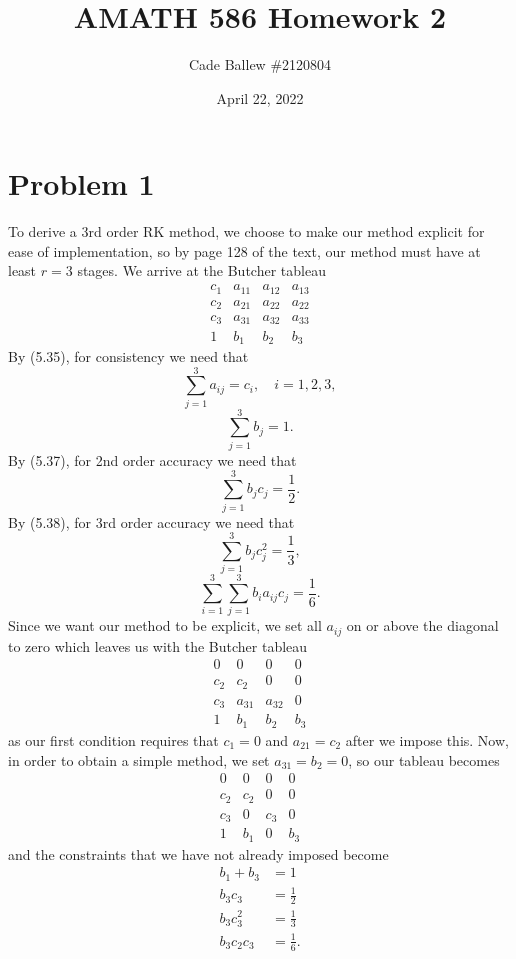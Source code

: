 \documentclass{article}
\title{AMATH 586 Homework 2}
\author{Cade Ballew \#2120804}
\date{April 22, 2022}
\begin{document}
	
\maketitle
	
\section{Problem 1}
To derive a 3rd order RK method, we choose to make our method explicit for ease of implementation, so by page 128 of the text, our method must have at least $r=3$ stages. We arrive at the Butcher tableau 
\[
\renewcommand\arraystretch{1.2}
\begin{array}
	{c|ccc}
	c_1 & a_{11}&a_{12}&a_{13}\\
	c_2 &a_{21} &a_{22} &a_{22}\\
	c_3 &a_{31} &a_{32} &a_{33}\\
	\hline
	1& b_1 &b_2 &b_3
\end{array}
\]
By (5.35), for consistency we need that 
\[
\sum_{j=1}^{3}a_{ij}=c_i, \quad i=1,2,3,
\]
\[
\sum_{j=1}^{3}b_j=1.
\]
By (5.37), for 2nd order accuracy we need that
\[
\sum_{j=1}^{3}b_jc_j=\frac{1}{2}.
\]
By (5.38), for 3rd order accuracy we need that
\[
\sum_{j=1}^{3}b_jc^2_j=\frac{1}{3},
\]
\[
\sum_{i=1}^{3}\sum_{j=1}^{3}b_ia_{ij}c_j=\frac{1}{6}.
\]
Since we want our method to be explicit, we set all $a_{ij}$ on or above the diagonal to zero which leaves us with the Butcher tableau
\[
\renewcommand\arraystretch{1.2}
\begin{array}
	{c|ccc}
	0 & 0&0&0\\
	c_2 &c_2 &0 &0\\
	c_3 &a_{31} &a_{32} &0\\
	\hline
	1& b_1 &b_2 &b_3
\end{array}
\]
as our first condition requires that $c_1=0$ and $a_{21}=c_2$ after we impose this. Now, in order to obtain a simple method, we set $a_{31}=b_2=0$, so our tableau becomes
\[
\renewcommand\arraystretch{1.2}
\begin{array}
	{c|ccc}
	0 & 0&0&0\\
	c_2 &c_2 &0 &0\\
	c_3 &0 &c_3 &0\\
	\hline
	1& b_1 &0 &b_3
\end{array}
\]
and the constraints that we have not already imposed become
\begin{align*}
	b_1+b_3&=1\\
	b_3c_3&=\frac{1}{2}\\
	b_3c_3^2&=\frac{1}{3}\\
	b_3c_2c_3&=\frac{1}{6}.
\end{align*}
\end{document}
